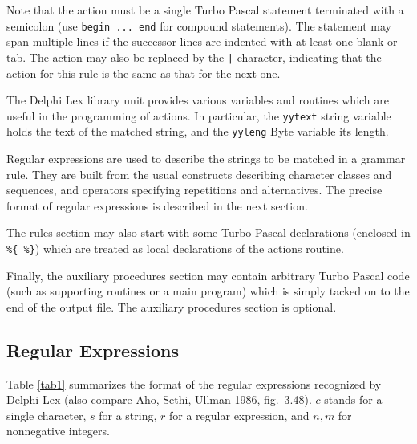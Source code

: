 \documentclass{article}
\begin{document}
Note that the action must be a single Turbo Pascal statement terminated
with a semicolon (use \verb"begin ... end" for compound statements). The
statement may span multiple lines if the successor lines are indented with
at least one blank or tab. The action may also be replaced by the \verb"|"
character, indicating that the action for this rule is the same as that for
the next one.

The Delphi Lex library unit provides various variables and routines which are
useful in the programming of actions. In particular, the \verb"yytext" string
variable holds the text of the matched string, and the \verb"yyleng" Byte
variable its length.

Regular expressions are used to describe the strings to be matched in a
grammar rule. They are built from the usual constructs describing character
classes and sequences, and operators specifying repetitions and alternatives.
The precise format of regular expressions is described in the next section.

The rules section may also start with some Turbo Pascal declarations
(enclosed in \verb"%{ %}") which are treated as local declarations of the
actions routine.

Finally, the auxiliary procedures section may contain arbitrary Turbo
Pascal code (such as supporting routines or a main program) which is
simply tacked on to the end of the output file. The auxiliary procedures
section is optional.

\subsection{Regular Expressions}

Table \ref{tab1} summarizes the format of the regular expressions
recognized by Delphi Lex (also compare Aho, Sethi, Ullman 1986, fig.\ 3.48).
$c$ stands for a single character, $s$ for a string, $r$ for a regular
expression, and $n,m$ for nonnegative integers.
\end{document}
